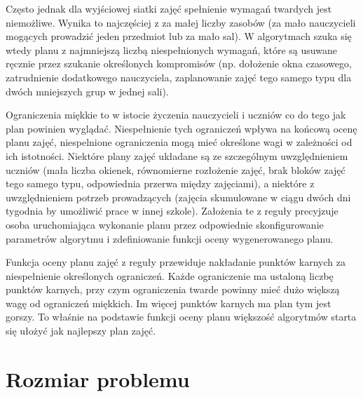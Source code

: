 Często jednak dla wyjściowej siatki zajęć spełnienie wymagań twardych jest niemożliwe. Wynika to najczęściej z za małej liczby zasobów (za mało nauczycieli mogących prowadzić jeden przedmiot lub za mało sal). W algorytmach szuka się wtedy planu z najmniejszą liczbą niespełnionych wymagań, które są usuwane ręcznie przez szukanie określonych kompromisów (np. dołożenie okna czasowego, zatrudnienie dodatkowego nauczyciela, zaplanowanie zajęć tego samego typu dla dwóch mniejszych grup w jednej sali).

Ograniczenia miękkie to w istocie życzenia nauczycieli i uczniów co do tego jak  plan powinien wyglądać. Niespełnienie tych ograniczeń wpływa na końcową ocenę planu zajęć, niespelnione ograniczenia mogą mieć określone wagi w zależności od ich istotności. Niektóre plany zajęć układane są ze szczególnym uwzględnieniem uczniów (mała liczba okienek, równomierne rozłożenie zajęć, brak bloków zajęć tego samego typu, odpowiednia przerwa między zajęciami), a niektóre z uwzględnieniem potrzeb prowadzących (zajęcia skumulowane w ciągu dwóch dni tygodnia by umożliwić prace w innej szkole). Założenia te z reguły precyjzuje osoba uruchomiająca wykonanie planu przez odpowiednie skonfigurowanie parametrów algorytmu i zdefiniowanie funkcji oceny wygenerowanego planu.

Funkcja oceny planu zajęć z reguły przewiduje nakładanie punktów karnych za niespełnienie określonych ograniczeń. Każde ograniczenie ma ustaloną liczbę punktów karnych, przy czym ograniczenia twarde powinny mieć dużo większą wagę od ograniczeń miękkich. Im więcej punktów karnych ma plan tym jest gorszy. To właśnie na podstawie funkcji oceny planu większość algorytmów starta się ułożyć jak najlepszy plan zajęć.

\section {Rozmiar problemu}

